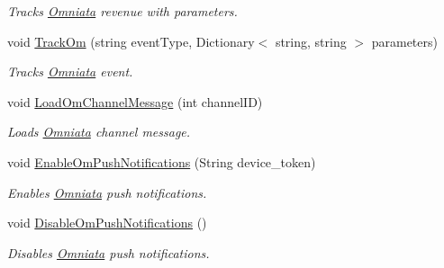 \begin{DoxyCompactItemize}
\begin{DoxyCompactList}\small\item\em Tracks \hyperlink{class_omniata_s_d_k_1_1_omniata}{Omniata} revenue with parameters. \end{DoxyCompactList}\item 
void \hyperlink{class_omniata_s_d_k_1_1_omniata_af23be71f9bc730875e366452ea3866ab}{Track\+Om} (string event\+Type, Dictionary$<$ string, string $>$ parameters)
\begin{DoxyCompactList}\small\item\em Tracks \hyperlink{class_omniata_s_d_k_1_1_omniata}{Omniata} event. \end{DoxyCompactList}\item 
void \hyperlink{class_omniata_s_d_k_1_1_omniata_a3ec7dc1f37d98f16c811ce1988dd35b3}{Load\+Om\+Channel\+Message} (int channel\+I\+D)
\begin{DoxyCompactList}\small\item\em Loads \hyperlink{class_omniata_s_d_k_1_1_omniata}{Omniata} channel message. \end{DoxyCompactList}\item 
void \hyperlink{class_omniata_s_d_k_1_1_omniata_a8a8d3860177250a5c95b91a6cac07545}{Enable\+Om\+Push\+Notifications} (String device\+\_\+token)
\begin{DoxyCompactList}\small\item\em Enables \hyperlink{class_omniata_s_d_k_1_1_omniata}{Omniata} push notifications. \end{DoxyCompactList}\item 
void \hyperlink{class_omniata_s_d_k_1_1_omniata_a1c8af86696b87cbcfb9f54dcfe0ae4bd}{Disable\+Om\+Push\+Notifications} ()
\begin{DoxyCompactList}\small\item\em Disables \hyperlink{class_omniata_s_d_k_1_1_omniata}{Omniata} push notifications. \end{DoxyCompactList}\end{DoxyCompactItemize}
